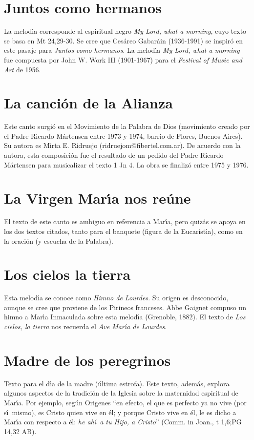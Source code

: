 \documentclass[landscape,12pt]{report}
\begin{document}
\section*{\small Juntos como hermanos} \noindent\footnotesize La melod\'\i a corresponde al espiritual negro \textit{My Lord, what a morning}, cuyo texto se basa en Mt 24,29-30. Se cree que Ces\'areo Gabar\'ain (1936-1991) se inspir\'o en este pasaje para \textit{Juntos como hermanos}. La melod\'\i a \textit{My Lord, what a morning} fue compuesta por John W. Work III (1901-1967) para el \emph{Festival of Music and Art} de 1956. 
\section*{\small La canci\'on de la Alianza} \noindent\footnotesize Este canto surgi\'o en el Movimiento de la Palabra de Dios (movimiento creado por el Padre Ricardo M\'artensen entre 1973 y 1974, barrio de Flores, Buenos Aires). Su autora es Mirta E. Ridruejo (ridruejom@fibertel.com.ar). De acuerdo con la autora, esta composici\'on fue el resultado de un pedido del Padre Ricardo M\'artensen para musicalizar el texto 1 Jn 4. La obra se finaliz\'o entre 1975 y 1976.
\section*{\small La Virgen Mar\'\i a nos re\'une} \noindent\footnotesize El texto de este canto es ambiguo en referencia a Mar\'\i a, pero quiz\'as se apoya en los dos textos citados, tanto para el banquete (figura de la Eucarist\'\i a), como en la oraci\'on (y escucha de la Palabra).
\section*{\small Los cielos la tierra} \noindent\footnotesize Esta melod\'\i a se conoce como \textit{Himno de Lourdes}. Su origen es desconocido, aunque se cree que proviene de los Pirineos franceses. Abbe Gaignet compuso un himno a Mar\'\i a Inmaculada sobre esta melod\'\i a (Grenoble, 1882). El texto de \textit{Los cielos, la tierra} nos recuerda el \textit{Ave Mar\'\i a de Lourdes}.
\section*{\small Madre de los peregrinos} \noindent\footnotesize Texto para el d\'\i a de la madre (\'ultima estrofa). Este texto, adem\'as, explora algunos aspectos de la tradici\'on de la Iglesia sobre la maternidad espiritual de Mar\'\i a. Por ejemplo, seg\'un Origenes ``en efecto, el que es perfecto ya no vive (por s\'\i\ mismo), es Cristo quien vive en \'el; y porque Cristo vive en \'el, le es dicho a Mar\'\i a con respecto a \'el: \textit{he ah\'\i\ a tu Hijo, a Cristo}'' (Comm. in Joan., t 1,6;PG 14,32 AB).
\end{document}
